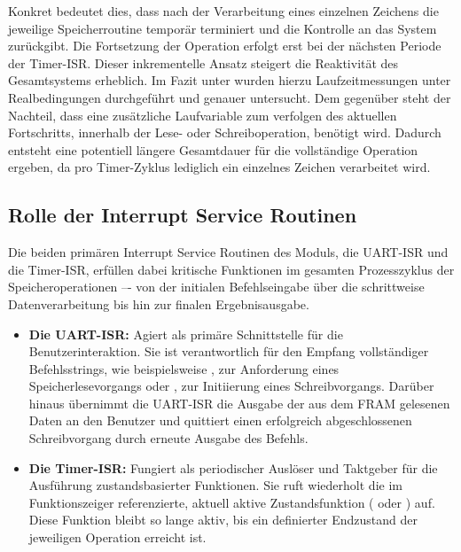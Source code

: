 Konkret bedeutet dies, dass nach der Verarbeitung eines einzelnen Zeichens die jeweilige Speicherroutine tempor\"ar terminiert und die Kontrolle an das System zur\"uckgibt. Die Fortsetzung der Operation erfolgt erst bei der n\"achsten Periode der Timer-ISR. Dieser inkrementelle Ansatz steigert die Reaktivit\"at des Gesamtsystems erheblich. Im Fazit unter  wurden hierzu Laufzeitmessungen unter Realbedingungen durchgef\"uhrt und genauer untersucht. Dem gegen\"uber steht der Nachteil, dass eine zus\"atzliche Laufvariable zum verfolgen des aktuellen Fortschritts, innerhalb der Lese- oder Schreiboperation, ben\"otigt wird. Dadurch entsteht eine potentiell l\"angere Gesamtdauer f\"ur die vollst\"andige Operation ergeben, da pro Timer-Zyklus lediglich ein einzelnes Zeichen verarbeitet wird.\AI


\subsection{Rolle der Interrupt Service Routinen}
\label{sec:LesenSchreiben_Rolle_ISR}

Die beiden prim\"aren Interrupt Service Routinen des Moduls, die UART-ISR und die Timer-ISR, erf\"ullen dabei kritische Funktionen im gesamten Prozesszyklus der Speicheroperationen –- von der initialen Befehlseingabe \"uber die schrittweise Datenverarbeitung bis hin zur finalen Ergebnisausgabe.

\begin{itemize}
	\item \textbf{Die UART-ISR:} Agiert als prim\"are Schnittstelle f\"ur die Benutzerinteraktion. Sie ist verantwortlich f\"ur den Empfang vollst\"andiger Befehlsstrings, wie beispielsweise \grqq{}\grqq, zur Anforderung eines Speicherlesevorgangs oder \grqq{}\grqq, zur Initiierung eines Schreibvorgangs. Dar\"uber hinaus \"ubernimmt die UART-ISR die Ausgabe der aus dem FRAM gelesenen Daten an den Benutzer und quittiert einen erfolgreich abgeschlossenen Schreibvorgang durch erneute Ausgabe des Befehls.
	
	\item \textbf{Die Timer-ISR:} Fungiert als periodischer Ausl\"oser und Taktgeber f\"ur die Ausf\"uhrung zustandsbasierter Funktionen. Sie ruft wiederholt die im Funktionszeiger  referenzierte, aktuell aktive Zustandsfunktion (\zB {} oder ) auf. Diese Funktion bleibt so lange aktiv, bis ein definierter Endzustand der jeweiligen Operation erreicht ist.
\end{itemize}

